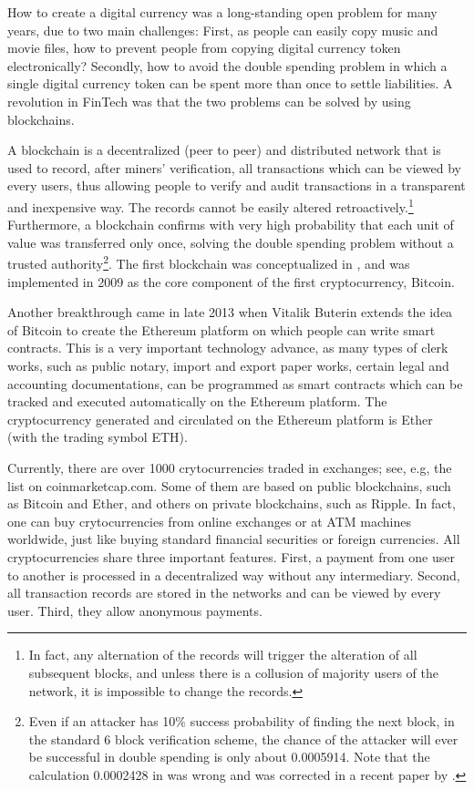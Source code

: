 \documentclass[11pt]{article}%
\numberwithin{equation}{section}
\theoremstyle{plain}
\begin{document}
How to create a digital currency was a long-standing open problem for many years, due to two main challenges: First, as people can easily copy music and movie files, how to prevent people from copying digital currency token electronically? Secondly, how to avoid the double spending problem in which a single digital currency token can be spent more than once to settle liabilities. A revolution in FinTech was that the two problems can be solved by using blockchains.

A blockchain is a decentralized (peer to peer) and distributed network that is used to record, after miners' verification, all transactions which can be viewed by every users, thus allowing people to verify and audit transactions in a transparent and inexpensive way. The records cannot be easily altered retroactively.\footnote{In fact, any alternation of the records will trigger the alteration of all subsequent blocks, and unless there is a collusion of majority users of the network, it is impossible to change the records.} Furthermore, a blockchain confirms with very high probability that each unit of value was transferred only once, solving the  double spending problem without a trusted authority\footnote{Even if an attacker has 10\% success probability of finding the next block, in the standard 6 block verification scheme, the chance of the attacker will ever be successful in double spending is only about 0.0005914. Note that the calculation 0.0002428 in \cite{nakamoto_bitcoin:_2008} was wrong and was corrected in a recent paper by \cite{Grunspan_2018}.}. The first blockchain was conceptualized in \cite{nakamoto_bitcoin:_2008}, and was implemented in 2009 as the core component of the first cryptocurrency, Bitcoin.

Another breakthrough came in late 2013 when Vitalik Buterin extends the idea of Bitcoin to create the Ethereum platform on which people can write smart contracts. This is a very important technology advance, as many types of clerk works, such as public notary, import and export paper works, certain legal and accounting documentations, can be
programmed as smart contracts which can be tracked and executed automatically on the Ethereum platform. The cryptocurrency generated and circulated on the Ethereum platform is Ether (with the trading symbol ETH).

Currently, there are over 1000 crytocurrencies traded in exchanges; see, e.g, the list on coinmarketcap.com. Some of them are based on public blockchains, such as Bitcoin and Ether, and others on private blockchains, such as Ripple. In fact, one can buy crytocurrencies from online exchanges or at ATM machines worldwide, just like buying standard financial securities or foreign currencies.  All cryptocurrencies share three important features. First, a payment from one user to another is processed in a decentralized way without any intermediary. Second, all transaction records are stored in the networks and can be viewed by every user. Third, they allow anonymous payments.
\end{document}
